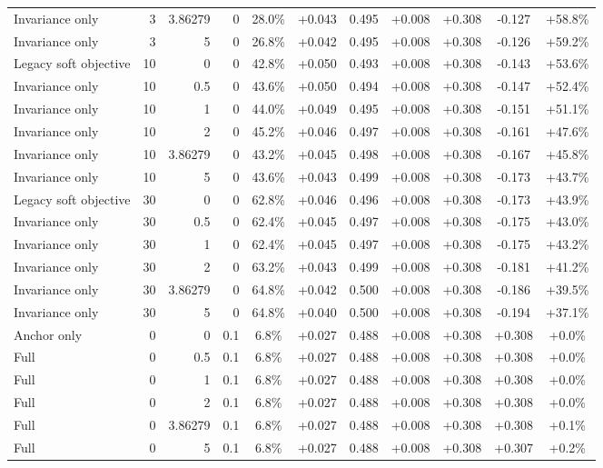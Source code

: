 \begin{table}[htbp]
\begin{tabular}{lrrrccccccc}
Invariance only & 3 & 3.86279 & 0 & 28.0\% & +0.043 & 0.495 & +0.008 & +0.308 & -0.127 & +58.8\% \\
Invariance only & 3 & 5 & 0 & 26.8\% & +0.042 & 0.495 & +0.008 & +0.308 & -0.126 & +59.2\% \\
Legacy soft objective & 10 & 0 & 0 & 42.8\% & +0.050 & 0.493 & +0.008 & +0.308 & -0.143 & +53.6\% \\
Invariance only & 10 & 0.5 & 0 & 43.6\% & +0.050 & 0.494 & +0.008 & +0.308 & -0.147 & +52.4\% \\
Invariance only & 10 & 1 & 0 & 44.0\% & +0.049 & 0.495 & +0.008 & +0.308 & -0.151 & +51.1\% \\
Invariance only & 10 & 2 & 0 & 45.2\% & +0.046 & 0.497 & +0.008 & +0.308 & -0.161 & +47.6\% \\
Invariance only & 10 & 3.86279 & 0 & 43.2\% & +0.045 & 0.498 & +0.008 & +0.308 & -0.167 & +45.8\% \\
Invariance only & 10 & 5 & 0 & 43.6\% & +0.043 & 0.499 & +0.008 & +0.308 & -0.173 & +43.7\% \\
Legacy soft objective & 30 & 0 & 0 & 62.8\% & +0.046 & 0.496 & +0.008 & +0.308 & -0.173 & +43.9\% \\
Invariance only & 30 & 0.5 & 0 & 62.4\% & +0.045 & 0.497 & +0.008 & +0.308 & -0.175 & +43.0\% \\
Invariance only & 30 & 1 & 0 & 62.4\% & +0.045 & 0.497 & +0.008 & +0.308 & -0.175 & +43.2\% \\
Invariance only & 30 & 2 & 0 & 63.2\% & +0.043 & 0.499 & +0.008 & +0.308 & -0.181 & +41.2\% \\
Invariance only & 30 & 3.86279 & 0 & 64.8\% & +0.042 & 0.500 & +0.008 & +0.308 & -0.186 & +39.5\% \\
Invariance only & 30 & 5 & 0 & 64.8\% & +0.040 & 0.500 & +0.008 & +0.308 & -0.194 & +37.1\% \\
Anchor only & 0 & 0 & 0.1 & 6.8\% & +0.027 & 0.488 & +0.008 & +0.308 & +0.308 & +0.0\% \\
Full & 0 & 0.5 & 0.1 & 6.8\% & +0.027 & 0.488 & +0.008 & +0.308 & +0.308 & +0.0\% \\
Full & 0 & 1 & 0.1 & 6.8\% & +0.027 & 0.488 & +0.008 & +0.308 & +0.308 & +0.0\% \\
Full & 0 & 2 & 0.1 & 6.8\% & +0.027 & 0.488 & +0.008 & +0.308 & +0.308 & +0.0\% \\
Full & 0 & 3.86279 & 0.1 & 6.8\% & +0.027 & 0.488 & +0.008 & +0.308 & +0.308 & +0.1\% \\
Full & 0 & 5 & 0.1 & 6.8\% & +0.027 & 0.488 & +0.008 & +0.308 & +0.307 & +0.2\% \\

\end{tabular}
\end{table}
